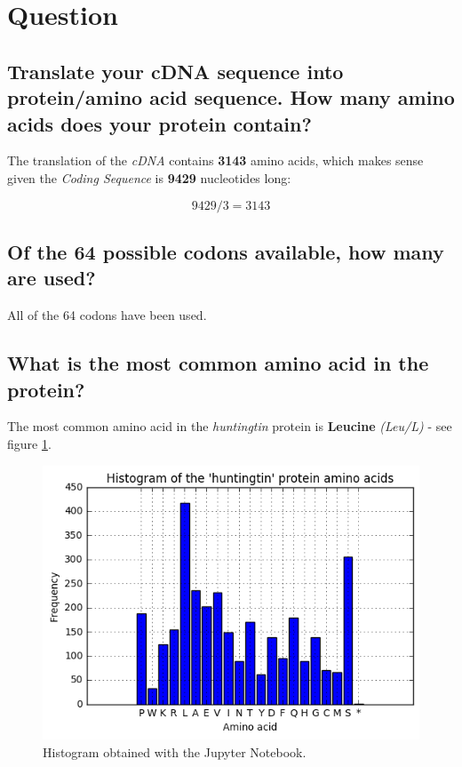\section{Question}

\subsection{Translate your cDNA sequence into protein/amino acid sequence. How many amino acids does your protein contain?  }

The translation of the \textit{cDNA} contains \textbf{3143} amino acids, which makes sense given the \textit{Coding Sequence} is \textbf{9429} nucleotides long:

\[
    9429 / 3 = 3143
\]

\medskip


\subsection{Of the 64 possible codons available, how many are used?}

All of the 64 codons have been used.

\medskip


\subsection{What is the most common amino acid in the protein?}

The most common amino acid in the \textit{huntingtin} protein is \textbf{Leucine} \textit{(Leu/L)} - see figure \ref{fig:amino-acids-hist}.

\begin{figure}[ht]
    \centering
    \includegraphics[width=0.8\linewidth]{res/amino-acids-hist.png}
    \caption{Histogram obtained with the Jupyter Notebook.}
    \label{fig:amino-acids-hist}
\end{figure}

